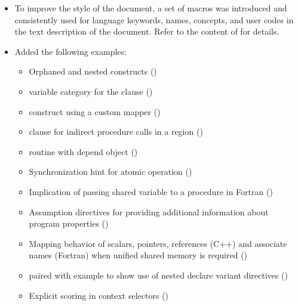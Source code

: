 \begin{itemize}
\item To improve the style of the document, a set of macros was introduced
  and consistently used for language keywords, names, concepts, and user codes
  in the text description of the document.  Refer to the content of 
  for details.

\item Added the following examples:
\begin{itemize}
  \item Orphaned and nested  constructs ()
  \item {} variable category for the  clause
    ()
  \item {} construct using a custom mapper
    ()
  \item {} clause for indirect procedure calls in a
     region ()
  \item {} routine with depend object
    ()
  \item Synchronization hint for atomic operation ()
  \item Implication of passing shared variable to a procedure
    in Fortran ()
  \item Assumption directives for providing additional information
    about program properties ()
  \item Mapping behavior of scalars, pointers, references (C++) and associate names
        (Fortran) when unified shared memory is required
    ()
  \item {} paired with 
    example to show use of nested declare variant 
    directives ()
  \item Explicit scoring in context selectors
    ()
\end{itemize}


\end{itemize}
